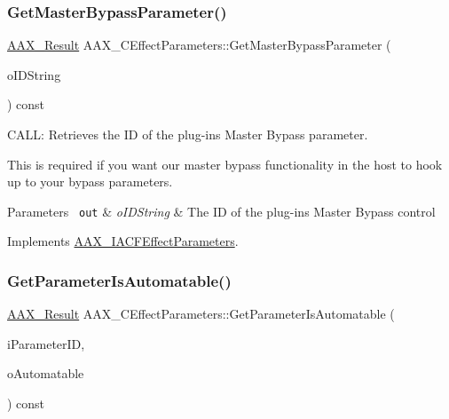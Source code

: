 \mbox{\label{a01481_afe1313da2e24225af2f224623dca6b95}} 
\subsubsection{\texorpdfstring{GetMasterBypassParameter()}{GetMasterBypassParameter()}}
{\footnotesize\ttfamily \mbox{\hyperlink{a00392_a4d8f69a697df7f70c3a8e9b8ee130d2f}{A\+A\+X\+\_\+\+Result}} A\+A\+X\+\_\+\+C\+Effect\+Parameters\+::\+Get\+Master\+Bypass\+Parameter (\begin{DoxyParamCaption}\item[{\mbox{\hyperlink{a01873}{A\+A\+X\+\_\+\+I\+String}} $\ast$}]{o\+I\+D\+String }\end{DoxyParamCaption}) const\hspace{0.3cm}{\ttfamily [virtual]}}



C\+A\+LL\+: Retrieves the ID of the plug-\/in\textquotesingle{}s Master Bypass parameter. 

This is required if you want our master bypass functionality in the host to hook up to your bypass parameters.


\begin{DoxyParams}[1]{Parameters}
\mbox{\texttt{ out}}  & {\em o\+I\+D\+String} & The ID of the plug-\/in\textquotesingle{}s Master Bypass control \\
\hline
\end{DoxyParams}


Implements \mbox{\hyperlink{a01669_ab967122337b61064492024f8bf695ed4}{A\+A\+X\+\_\+\+I\+A\+C\+F\+Effect\+Parameters}}.

\mbox{\label{a01481_a8a0890eacee81afbea6a5548592e1c8f}} 
\subsubsection{\texorpdfstring{GetParameterIsAutomatable()}{GetParameterIsAutomatable()}}
{\footnotesize\ttfamily \mbox{\hyperlink{a00392_a4d8f69a697df7f70c3a8e9b8ee130d2f}{A\+A\+X\+\_\+\+Result}} A\+A\+X\+\_\+\+C\+Effect\+Parameters\+::\+Get\+Parameter\+Is\+Automatable (\begin{DoxyParamCaption}\item[{\mbox{\hyperlink{a00392_a1440c756fe5cb158b78193b2fc1780d1}{A\+A\+X\+\_\+\+C\+Param\+ID}}}]{i\+Parameter\+ID,  }\item[{\mbox{\hyperlink{a00392_aa216506530f1d19a2965931ced2b274b}{A\+A\+X\+\_\+\+C\+Boolean}} $\ast$}]{o\+Automatable }\end{DoxyParamCaption}) const\hspace{0.3cm}{\ttfamily [virtual]}}



